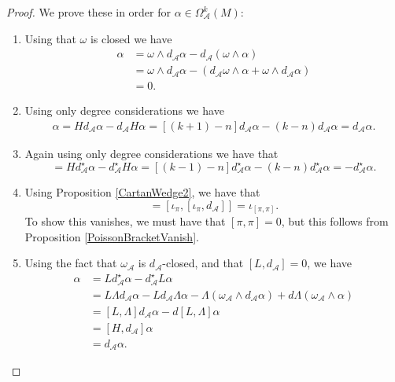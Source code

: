 \documentclass{amsart}
\newcommand{\A}{\mathcal{A}}
\theoremstyle{definition}
\begin{document}
 \begin{proof}
        We prove these in order for $\alpha \in \Omega_{\A}^k(M)$:
        \begin{enumerate}
            \item Using that $\omega$ is closed we have
            \begin{align*}
                [L,d_\A]\alpha &= \omega \wedge d_\A\alpha - d_\A(\omega \wedge \alpha) \\
                &= \omega \wedge d_\A \alpha - (d_\A\omega \wedge \alpha  +\omega \wedge d_\A \alpha) \\
                &= 0.
            \end{align*}
            \item Using only degree considerations we have
            \begin{align*}
               [H,d_\A]\alpha = Hd_\A \alpha  -d_\A H\alpha = [(k+1)-n]d_\A \alpha - (k-n)d_\A \alpha = d_\A \alpha.
            \end{align*}
            \item Again using only degree considerations we have that
            \begin{equation*}
                [H,d_\A^\star]=Hd_\A^\star \alpha - d_\A^\star H \alpha = [(k-1)-n]d_\A^\star \alpha - (k-n)d_\A^\star \alpha = -d_\A^\star \alpha.
            \end{equation*}
            \item Using Proposition \ref{CartanWedge2}, we have that
            \begin{equation*}
               [\Lambda,d_\A^\star] =[\iota_\pi,[\iota_\pi,d_\A]]=\iota_{[\pi,\pi]}.
            \end{equation*}
            To show this vanishes, we must have that $[\pi,\pi]=0$, but this follows from Proposition \ref{PoissonBracketVanish}.
            \item Using the fact that $\omega_\A$ is $d_\A$-closed, and that $[L,d_\A]=0$, we have
            \begin{align*}
                [L,d_\A^\star]\alpha &= Ld_\A^\star \alpha - d_\A^\star L\alpha \\
                &=L\Lambda d_\A \alpha - Ld_\A \Lambda \alpha - \Lambda(\omega_\A \wedge d_\A \alpha) + d \Lambda (\omega_\A \wedge \alpha) \\
                &=[L,\Lambda]d_\A \alpha - d[L,\Lambda]\alpha \\
                &= [H,d_\A]\alpha \\
                &=d_\A\alpha.
            \end{align*}
            

\end{enumerate}
\end{proof}
\end{document}
